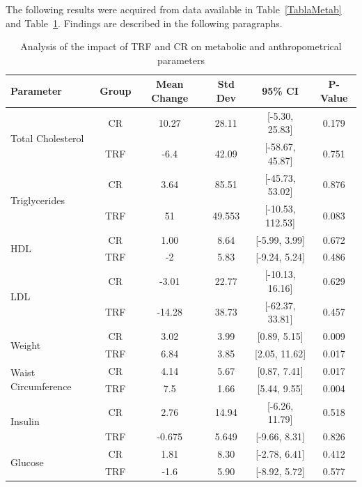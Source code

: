 \documentclass[journal,article,submit,pdftex,moreauthors]{Definitions/mdpi}
\begin{document}
{\color{blue}The following results were acquired from data available in Table~\ref{TablaMetab} and Table~\ref{TablaAnal}. Findings are described in the following paragraphs.

\begin{table}[h]
\centering
\caption{Analysis of the impact of TRF and CR on metabolic and anthropometrical parameters\label{TablaAnal}}
\begin{tabular}{lccccc}
\hline
\textbf{Parameter} & \textbf{Group} & \textbf{Mean Change} & \textbf{Std Dev} & \textbf{95\% CI} & \textbf{P-Value} \\
\hline
\multirow{2}{*}{Total Cholesterol} & CR & 10.27 & 28.11 & [-5.30, 25.83] & 0.179 \\
                                  & TRF & -6.4 & 42.09 & [-58.67, 45.87] & 0.751 \\
\hline
\multirow{2}{*}{Triglycerides}     & CR & 3.64 & 85.51 & [-45.73, 53.02] & 0.876 \\
                                  & TRF & 51 & 49.553 & [-10.53, 112.53] & 0.083 \\
\hline
\multirow{2}{*}{HDL}               & CR & 1.00 & 8.64 & [-5.99, 3.99] & 0.672 \\
                                  & TRF & -2 & 5.83 & [-9.24, 5.24] & 0.486 \\
\hline
\multirow{2}{*}{LDL}               & CR & -3.01 & 22.77 & [-10.13, 16.16] & 0.629 \\
                                  & TRF & -14.28 & 38.73 & [-62.37, 33.81] & 0.457 \\
\hline
\multirow{2}{*}{Weight}            & CR & 3.02 & 3.99 & [0.89, 5.15] & 0.009 \\
                                  & TRF & 6.84 & 3.85 & [2.05, 11.62] & 0.017 \\
\hline
\multirow{2}{*}{Waist Circumference} & CR & 4.14 & 5.67 & [0.87, 7.41] & 0.017 \\
                                    & TRF & 7.5 & 1.66 & [5.44, 9.55] & 0.004 \\
\hline
\multirow{2}{*}{Insulin}           & CR & 2.76 & 14.94 & [-6.26, 11.79] & 0.518 \\
                                  & TRF & -0.675 & 5.649 & [-9.66, 8.31] & 0.826 \\
\hline
\multirow{2}{*}{Glucose}           & CR & 1.81 & 8.30 & [-2.78, 6.41] & 0.412 \\
                                  & TRF & -1.6 & 5.90 & [-8.92, 5.72] & 0.577 \\
\hline
\end{tabular}
\end{table}


}
\end{document}
